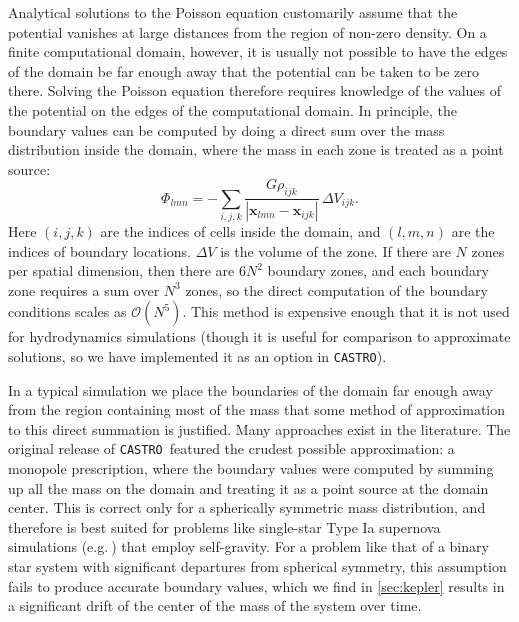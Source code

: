 \documentclass[iop]{../emulateapj}
\newcommand{\castro}{\texttt{CASTRO}}
\begin{document}
Analytical solutions to the Poisson equation customarily assume that the
potential vanishes at large distances from the region of non-zero
density. On a finite computational domain, however, it is usually not
possible to have the edges of the domain be far enough away that the
potential can be taken to be zero there. Solving the Poisson equation
therefore requires knowledge of the values of the potential on the
edges of the computational domain. In principle, the boundary values can be computed
by doing a direct sum over the mass distribution inside the domain,
where the mass in each zone is treated as a point source:
\begin{equation}
  \Phi_{{lmn}} = -\sum_{{i, j, k}} \frac{G \rho_{{ijk}}}{|\mathbf{x}_{{lmn}} - \mathbf{x}_{{ijk}}|}\, \Delta V_{{ijk}}.\label{eq:direct_sum}
\end{equation}
Here $(i, j, k)$ are the indices of cells inside the domain, and $(l,m, n)$ 
are the indices of boundary locations. $\Delta V$ is the volume of the
zone. If there are $N$ zones per spatial dimension, then there are
$6 N^2$ boundary zones, and each boundary zone requires a sum over
$N^3$ zones, so the direct computation of the boundary conditions
scales as $\mathcal{O}(N^5)$.  This method is expensive enough that it is not used
for hydrodynamics simulations (though it is useful for comparison to
approximate solutions, so we have implemented it as an option in \castro).

In a typical simulation we place the boundaries of the domain far
enough away from the region containing most of the mass that some
method of approximation to this direct summation is justified. Many
approaches exist in the literature. The original release of \castro\
featured the crudest possible approximation: a monopole prescription,
where the boundary values were computed by summing up all the mass on
the domain and treating it as a point source at the domain
center. This is correct only for a spherically symmetric mass
distribution, and therefore is best suited for problems like
single-star Type Ia supernova simulations (e.g.$\ $\cite{malone:2014})
that employ self-gravity. For a problem like that of a binary star system
with significant departures from spherical symmetry, this assumption
fails to produce accurate boundary values, which we find in \autoref{sec:kepler}
results in a significant drift of the center of the mass of the system over time.
\end{document}
